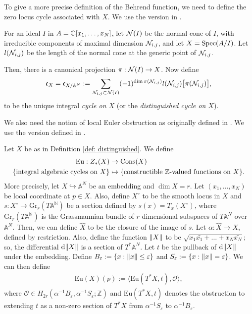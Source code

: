 \documentclass[11pt,a4paper,leqno,noamsfonts]{amsart}
\numberwithin{equation}{section}
\begin{document}
To give a more precise definition of the Behrend function, we need to define the zero locus cycle associated with $X$. We use the version in \cite[Section 1.1]{Beh}.
 \begin{definition}\label{def: distinguished}
     For an ideal $I$ in $A={\mathbb{C}}[x_1,\ldots,x_N]$, let ${\mathcal N}(I)$ be the normal cone of $I$, with irreducible components of maximal dimension ${\mathcal N}_{i,j}$, and let $X=\operatorname{Spec}(A/I)$. Let $l({\mathcal N}_{i,j})$ be the length of the normal cone at the generic point of ${\mathcal N}_{i,j}$. 
     
     
     Then, there is a canonical projection $\pi: {\mathcal N}(I) \to X$. Now define 
     \begin{align}\label{eq:distinguished}
        \mathfrak{c}_{X}=\mathfrak{c}_{X/{{\mathbb{A}}^N}}:=\sum_{{\mathcal N}_{i,j}\subset{\mathcal N}(I)}(-1)^{\dim\pi({\mathcal N}_{i,j})}l({\mathcal N}_{i,j})\big[\pi({\mathcal N}_{i,j})\big],
     \end{align}
     to be the unique integral \textit{cycle on $X$} (or the \emph{distinguished cycle on $X$}). 
 \end{definition}
We also need the notion of local Euler obstruction as originally defined in \cite[Section 3]{MacPherson}. We use the version defined in \cite[Section 1.2]{Beh}.
 \begin{definition}\label{Def?:Behrend2} Let $X$ be as in Definition \ref{def: distinguished}. We define
 \begin{align*}
     \mathrm{Eu} : Z_*(X)&\to \mathrm{Cons}(X)\\
     \{\text{integral algebraic cycles on $X$}\} &\mapsto \{\text{constructible ${\mathbb{Z}}$-valued
functions on $X$}\}.
 \end{align*}
 More precisely, let $X\hookrightarrow \mathbb{A}^N$ be an embedding and $\dim X=r$. Let $(x_1,\ldots,x_N)$ be local coordinate at $p\in X$. Also, define $X^{\circ}$ to be the smooth locus in $X$ and $s:X^{\circ}\to \mathrm{Gr}_r(T\mathbb{A^N})$ be a section defined by $s(x)=T_x(X^{\circ})$, where $\mathrm{Gr}_r(T\mathbb{A^N})$ is the Grassmannian bundle of $r$ dimensional subspaces of $T\mathbb{A}^N$ over $\mathbb{A}^N$. Then, we can define $\hat{X}$ to be the closure of the image of $s$. Let $\alpha:\hat{X} \to X$, defined by restriction. Also, define the function $\norm{X}$ to be $\sqrt{x_1\bar{x_1}+\ldots+x_N\bar{x_N}}$; so, the differential $\mathrm{d}\norm{X}$  is a section of $T^{*}\mathbb{A}^N$. Let $t$ be the pullback of  $\mathrm{d}\norm{X}$ under the embedding. Define $B_{\varepsilon}:=\{x:\norm{x}\leq \varepsilon\}$ and $S_{\varepsilon}:=\{x:\norm{x}=\varepsilon\}$. We can then define
 \begin{align*}
     \mathrm{Eu}(X)(p):=\langle\mathrm{Eu}(T^*X,t),\mathcal{O}\rangle,
 \end{align*}
     where $\mathcal{O}\in H_{2r}(\alpha^{-1}B_{\varepsilon},\alpha^{-1}S_{\varepsilon};\mathbb{Z} )$ and $\mathrm{Eu}(T^*X,t)$ denotes the
obstruction to extending $t$ as a non-zero section of $T^*X$ from $\alpha^{-1}S_{\varepsilon}$ to $\alpha^{-1}B_{\varepsilon}$.
 \end{definition}
\end{document}
